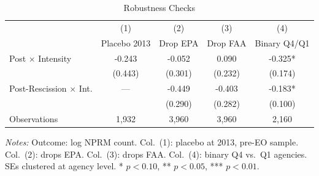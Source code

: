 \begin{table}[t]
\centering
\caption{Robustness Checks}
\label{tab:robustness}
\begin{threeparttable}
\begin{tabular}{lcccc}
\hline\hline
 & (1) & (2) & (3) & (4) \\
 & Placebo 2013 & Drop EPA & Drop FAA & Binary Q4/Q1 \\
\hline
Post $\times$ Intensity & -0.243 & -0.052 & 0.090 & -0.325* \\
 & (0.443) & (0.301) & (0.232) & (0.174) \\
\addlinespace
Post-Rescission $\times$ Int. & --- & -0.449 & -0.403 & -0.183* \\
 & & (0.290) & (0.282) & (0.100) \\
\addlinespace
Observations & 1,932 & 3,960 & 3,960 & 2,160 \\
\hline\hline
\end{tabular}
\begin{tablenotes}[flushleft]\footnotesize
\item \textit{Notes:} Outcome: log NPRM count. Col.~(1): placebo at 2013, pre-EO sample. Col.~(2): drops EPA. Col.~(3): drops FAA. Col.~(4): binary Q4 vs.\ Q1 agencies. SEs clustered at agency level. * $p<0.10$, ** $p<0.05$, *** $p<0.01$.
\end{tablenotes}
\end{threeparttable}
\end{table}
